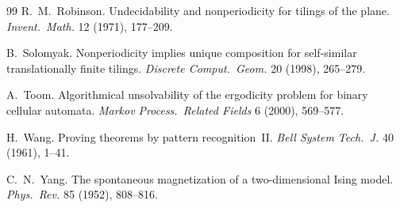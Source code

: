 \begin{thebibliography}{99}
 R.~M.~Robinson. Undecidability and nonperiodicity for tilings of the plane. \emph{Invent.\ Math.} 12 (1971), 177--209.

 B.~Solomyak. Nonperiodicity implies unique composition for self-similar translationally finite tilings. \emph{Discrete Comput.\ Geom.} 20 (1998), 265--279.

 A.~Toom. Algorithmical unsolvability of the ergodicity problem for binary cellular automata. \emph{Markov Process.\ Related Fields} 6 (2000), 569--577.

 H.~Wang. Proving theorems by pattern recognition~II. \emph{Bell System Tech.\ J.} 40 (1961), 1--41.

 C.~N.~Yang. The spontaneous magnetization of a two-dimensional Ising model. \emph{Phys.\ Rev.} 85 (1952), 808--816.

\end{thebibliography}
